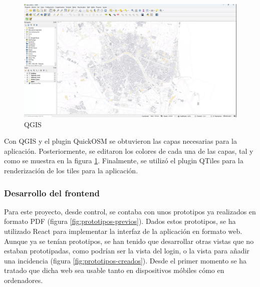 \documentclass{article}
\begin{document}
\begin{figure}[H]
    \center
    \includegraphics[width=14cm]{images/qgis.png}
    \caption{QGIS}
    \label{fig:qgis}
\end{figure}

Con QGIS y el plugin QuickOSM se obtuvieron las capas necesarias para la aplicación. Posteriormente, se editaron los colores de cada una de las capas, tal y como se muestra en la figura \ref{fig:qgis}. Finalmente, se utilizó el plugin QTiles para la renderización de los tiles para la aplicación.

\subsubsection{Desarrollo del frontend}

Para este proyecto, desde control, se contaba con unos prototipos ya realizados en formato PDF (figura \ref{fig:prototipos-previos}). Dados estos prototipos, se ha utilizado React para implementar la interfaz de la aplicación en formato web. Aunque ya se tenían prototipos, se han tenido que desarrollar otras vistas que no estaban prototipadas, como podrían ser la vista del login, o la vista para añadir una incidencia (figura \ref{fig:prototipos-creados}). Desde el primer momento se ha tratado que dicha web sea usable tanto en dispositivos móbiles cómo en ordenadores.
\end{document}
